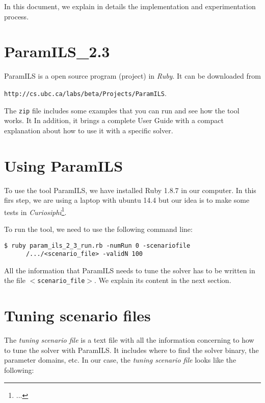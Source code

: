 In this document, we explain in details the implementation and experimentation process.

\section{ParamILS\_2.3}

{\sc ParamILS} is a open source program (project) in {\it Ruby}. It can be downloaded from 

\begin{center}
	\texttt{http://cs.ubc.ca/labs/beta/Projects/ParamILS}. 
\end{center}

The \texttt{zip} file includes some examples that you can run and see how the tool works. It In addition, it brings a complete User Guide with a compact explanation about how to use it with a specific solver. 

\section{Using ParamILS}

To use the tool {\sc ParamILS}, we have installed Ruby 1.8.7 in our computer. In this firs step, we are using a laptop with {\sc ubuntu 14.4} but our idea is to make some tests in {\it Curiosiphi}\footnote{...}.

To run the tool, we need to use the following command line:

\begin{verbatim}
$ ruby param_ils_2_3_run.rb -numRun 0 -scenariofile 
      /.../<scenario_file> -validN 100
\end{verbatim}


All the information that {\sc ParamILS} needs to tune the solver has to be written in the file \texttt{$<$scenario\_file$>$}. We explain its content in the next section.

\section{Tuning scenario files}

The {\it tuning scenario file} is a text file with all the information concerning to how to tune the solver with {\sc ParamILS}. It includes where to find the solver binary, the parameter domains, etc. In our case, the {\it tuning scenario file} looks like the following:

